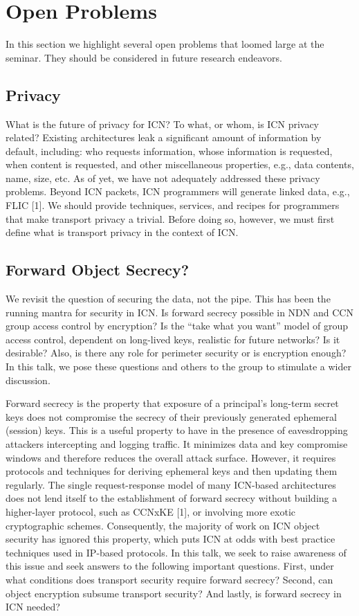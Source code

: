\section{Open Problems}
\label{sec:open-problems}

In this section we highlight several open problems that loomed large at the
seminar. They should be considered in future research endeavors.

\subsection{Privacy}
What is the future of privacy for ICN? To what, or whom, is ICN privacy related?
Existing architectures leak a significant amount of information by default,
including: who requests information, whose information is requested, when content
is requested, and other miscellaneous properties, e.g., data contents, name, size,
etc. As of yet, we have not adequately addressed these privacy problems.
Beyond ICN packets, ICN programmers will generate linked data, e.g., FLIC [1]. We
should provide techniques, services, and recipes for programmers that make transport
privacy a trivial. Before doing so, however, we must first define what is transport
privacy in the context of ICN.

\subsection{Forward Object Secrecy?}
We revisit the question of securing the data, not the pipe. This has been the
running mantra for security in ICN. Is forward secrecy possible in NDN and CCN
group access control by encryption? Is the ``take what you want'' model of group
access control, dependent on long-lived keys, realistic for future networks? Is
it desirable? Also, is there any role for perimeter security or is encryption
enough? In this talk, we pose these questions and others to the group to stimulate
a wider discussion.

Forward secrecy is the property that exposure of a principal's long-term secret keys
does not compromise the secrecy of their previously generated ephemeral (session)
keys. This is a useful property to have in the presence of eavesdropping attackers
intercepting and logging traffic. It minimizes data and key compromise windows and
therefore reduces the overall attack surface. However, it requires protocols and
techniques for deriving ephemeral keys and then updating them regularly. The single
request-response model of many ICN-based architectures does not lend itself to the
establishment of forward secrecy without building a higher-layer protocol, such as
CCNxKE [1], or involving more exotic cryptographic schemes. Consequently, the
majority of work on ICN object security has ignored this property, which puts ICN
at odds with best practice techniques used in IP-based protocols. In this talk, we
seek to raise awareness of this issue and seek answers to the following important
questions. First, under what conditions does transport security require forward
secrecy? Second, can object encryption subsume transport security? And lastly, is
forward secrecy in ICN needed?

